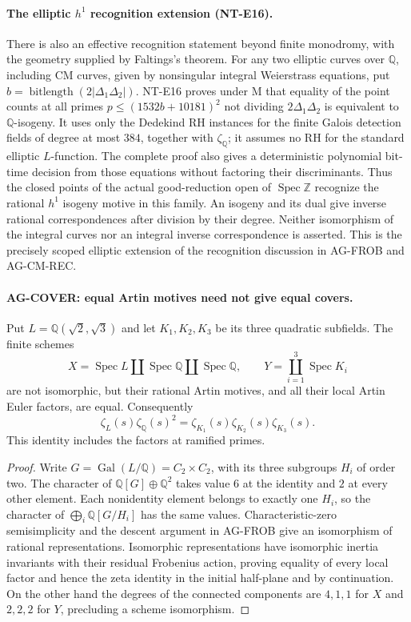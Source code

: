\paragraph{The elliptic $h^1$ recognition extension (NT-E16).}
There is also an effective recognition statement beyond finite
monodromy, with the geometry supplied by Faltings's theorem.
For any two elliptic curves over $\mathbb Q$, including CM
curves, given by nonsingular integral Weierstrass equations,
put $b=\operatorname{bitlength}(2|\Delta_1\Delta_2|)$.
NT-E16 proves under M that equality of the point counts at
all primes $p\le(1532b+10181)^2$ not dividing
$2\Delta_1\Delta_2$ is equivalent to $\mathbb Q$-isogeny.
It uses only the Dedekind RH instances for the finite
Galois detection fields of degree at most $384$, together
with $\zeta_{\mathbb Q}$; it assumes no RH for the standard
elliptic $L$-function.  The complete proof also gives a
deterministic polynomial bit-time decision from those
equations without factoring their discriminants.
Thus the closed points of the actual good-reduction open
of $\operatorname{Spec}\mathbb Z$ recognize the rational
$h^1$ isogeny motive in this family.  An isogeny and its
dual give inverse rational correspondences after division
by their degree.  Neither isomorphism of the integral
curves nor an integral inverse correspondence is asserted.
This is the precisely scoped elliptic extension of the
recognition discussion in AG-FROB and AG-CM-REC.

\paragraph{AG-COVER: equal Artin motives need not give equal covers.}
Put $L=\mathbb Q(\sqrt2,\sqrt3)$ and let $K_1,K_2,K_3$ be its three
quadratic subfields. The finite schemes
\[
 X=\operatorname{Spec}L\amalg\operatorname{Spec}\mathbb Q
       \amalg\operatorname{Spec}\mathbb Q,
 \qquad
 Y=\coprod_{i=1}^3\operatorname{Spec}K_i
\]
are not isomorphic, but their rational Artin motives, and all their local
Artin Euler factors, are equal. Consequently
\[
 \zeta_L(s)\zeta_{\mathbb Q}(s)^2
       =\zeta_{K_1}(s)\zeta_{K_2}(s)\zeta_{K_3}(s).
\]
This identity includes the factors at ramified primes.

\begin{proof}
Write $G=\operatorname{Gal}(L/\mathbb Q)=C_2\times C_2$, with its three
subgroups $H_i$ of order two. The character of
$\mathbb Q[G]\oplus\mathbb Q^2$ takes value $6$ at the identity and
$2$ at every other element. Each nonidentity element belongs to exactly
one $H_i$, so the character of $\bigoplus_i\mathbb Q[G/H_i]$ has the
same values. Characteristic-zero semisimplicity and the descent argument
in AG-FROB give an isomorphism of rational representations. Isomorphic
representations have isomorphic inertia invariants with their residual
Frobenius action, proving equality of every local factor and hence the
zeta identity in the initial half-plane and by continuation. On the other
hand the degrees of the connected components are $4,1,1$ for $X$ and
$2,2,2$ for $Y$, precluding a scheme isomorphism.
\end{proof}


